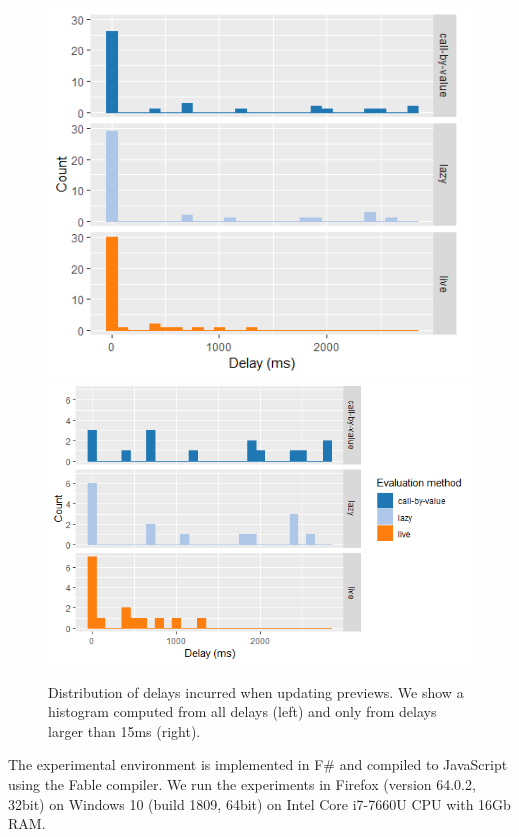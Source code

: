 \documentclass[english,crc]{programming}
\theoremstyle{plain}
\theoremstyle{definition}
\begin{document}
\begin{figure}[b]
\vspace{-0.5em}
\noindent
\includegraphics[scale=0.48]{figures/hist-all.png}
\includegraphics[scale=0.48]{figures/hist-slow.png}
\vspace{-0.25em}
\caption{Distribution of delays incurred when updating previews.
  We show a histogram computed from all delays (left) and only from delays larger
  than 15ms (right).}
\label{fig:drawing-hist}
\vspace{-0.75em}
\end{figure}


The experimental environment is implemented in F\# and compiled to JavaScript using the Fable
compiler. We run the experiments in Firefox (version 64.0.2, 32bit) on Windows 10
(build 1809, 64bit) on Intel Core i7-7660U CPU with 16Gb RAM.
\end{document}
